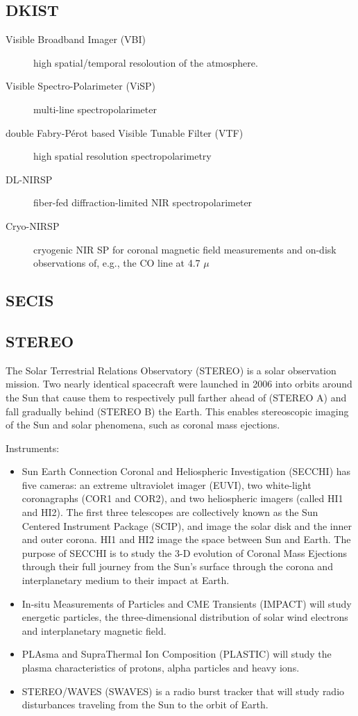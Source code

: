 \documentclass{article}
\begin{document}
\subsection{DKIST}
\begin{description}
    \item [Visible Broadband Imager (VBI)] high spatial/temporal resoloution
        of the atmosphere.
    \item [Visible Spectro-Polarimeter (ViSP)] multi-line spectropolarimeter
    \item [double Fabry-P\'erot based Visible Tunable Filter (VTF)] high spatial
        resolution spectropolarimetry
    \item [DL-NIRSP] fiber-fed diffraction-limited NIR spectropolarimeter
    \item [Cryo-NIRSP] cryogenic NIR SP for coronal magnetic field measurements
        and on-disk observations of, e.g., the CO line at 4.7 ${\mu}$
\end{description}
\subsection{SECIS}
\subsection{STEREO}
The Solar Terrestrial Relations Observatory (STEREO) is a solar observation
mission. Two nearly identical spacecraft were launched in 2006 into
orbits around the Sun that cause them to respectively pull farther ahead
of (STEREO A)
and fall gradually behind (STEREO B) the Earth. This enables stereoscopic
imaging of the Sun and solar phenomena, such as coronal mass ejections.

Instruments:
\begin{itemize}
    \item Sun Earth Connection Coronal and Heliospheric Investigation
        (SECCHI) has five cameras: an extreme ultraviolet imager (EUVI),
        two white-light coronagraphs (COR1 and COR2), and two heliospheric
        imagers (called HI1 and HI2). The first three telescopes are
        collectively known as the Sun Centered Instrument Package (SCIP),
        and image the solar disk and the inner and outer corona. HI1 and
        HI2 image the space between Sun and Earth. The purpose of SECCHI is
        to study the 3-D evolution of Coronal Mass Ejections through their
        full journey from the Sun's surface through the corona and
        interplanetary medium to their impact at Earth.
    \item In-situ Measurements of Particles and CME Transients (IMPACT) will
        study energetic particles, the three-dimensional distribution of
        solar wind electrons and interplanetary magnetic field.
    \item PLAsma and SupraThermal Ion Composition (PLASTIC) will study the
        plasma characteristics of protons, alpha particles and heavy
        ions.
    \item STEREO/WAVES (SWAVES) is a radio burst tracker that will study
        radio disturbances traveling from the Sun to the orbit of
        Earth.
\end{itemize}
\end{document}
